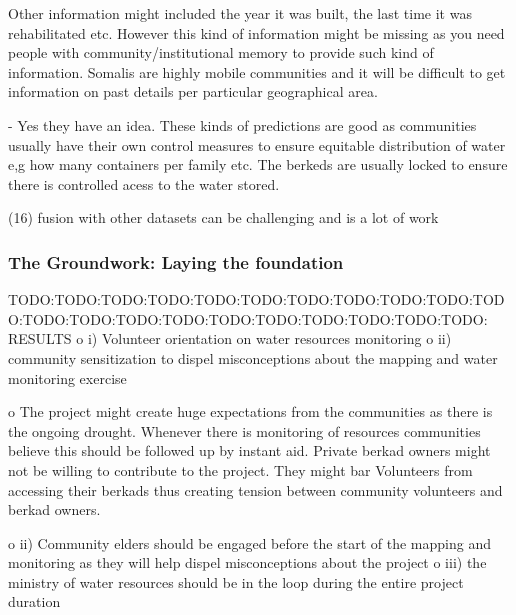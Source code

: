 Other information might included the year it was built, the last time it was rehabilitated etc. However this kind of information might be missing as you need people with community/institutional memory to provide such kind of information. Somalis are highly mobile communities and it will be difficult to get information on past details per particular geographical area.


-	Yes they have an idea. These kinds of predictions are good as communities usually have their own control measures to ensure equitable distribution of water e,g how many containers per family etc. The berkeds are usually locked to ensure there is controlled acess to the water stored.






(16) fusion with other datasets can be challenging and is a lot of work








\subsubsection{The Groundwork: Laying the foundation}
TODO:TODO:TODO:TODO:TODO:TODO:TODO:TODO:TODO:TODO:TODO:TODO:TODO:TODO:TODO:TODO:TODO:TODO:TODO:TODO:TODO:
RESULTS
o	i) Volunteer orientation on water resources monitoring
o	ii) community sensitization to dispel misconceptions about the mapping and water monitoring exercise

o	The project might create huge expectations from the communities as there is the ongoing drought. Whenever there is monitoring of resources communities believe this should be followed up by instant aid. Private berkad owners might not be willing to contribute to the project. They might bar Volunteers from accessing their berkads thus creating tension between community volunteers and berkad owners.

o	ii) Community elders should be engaged before the start of the mapping and monitoring as they will help dispel misconceptions about the project
o	iii) the ministry of water resources should be in the loop during the entire project duration

